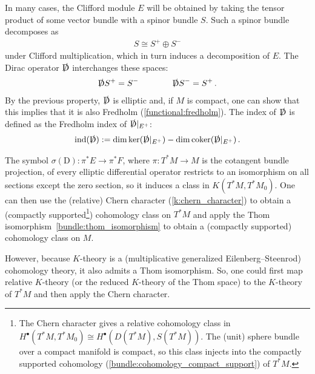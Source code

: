    \begin{definition}[Index]
        In many cases, the Clifford module $E$ will be obtained by taking the tensor product of some vector bundle with a spinor bundle $S$. Such a spinor bundle decomposes as
        \begin{gather}
            S\cong S^+\oplus S^-
        \end{gather}
        under Clifford multiplication, which in turn induces a decomposition of $E$. The Dirac operator $\slashed{\mathrm{D}}$ interchanges these spaces:
        \begin{gather}
            \slashed{\mathrm{D}}S^+=S^-\qquad\qquad\slashed{\mathrm{D}}S^-=S^+\,.
        \end{gather}
        By the previous property, $\slashed{\mathrm{D}}$ is elliptic and, if $M$ is compact, one can show that this implies that it is also Fredholm (\cref{functional:fredholm}). The index of $\slashed{\mathrm{D}}$ is defined as the Fredholm index of $\slashed{\mathrm{D}}|_{E^+}$:
        \begin{gather}
            \mathrm{ind}(\slashed{\mathrm{D}}) := \dim\ker(\slashed{\mathrm{D}}|_{E^+})-\dim\mathrm{coker}(\slashed{\mathrm{D}}|_{E^+})\,.
        \end{gather}
    \end{definition}

    The symbol $\sigma(\mathrm{D}):\pi^*E\rightarrow\pi^*F$, where $\pi:T^*M\rightarrow M$ is the cotangent bundle projection, of every elliptic differential operator restricts to an isomorphism on all sections except the zero section, so it induces a class in $K(T^*M,T^*M_0)$. One can then use the (relative) Chern character (\cref{k:chern_character}) to obtain a (compactly supported\footnote{The Chern character gives a relative cohomology class in $H^\bullet(T^*M,T^*M_0)\cong H^\bullet(D(T^*M),S(T^*M))$. The (unit) sphere bundle over a compact manifold is compact, so this class injects into the compactly supported cohomology (\cref{bundle:cohomology_compact_support}) of $T^*M$.}) cohomology class on $T^*M$ and apply the Thom isomorphism~\ref{bundle:thom_isomorphism} to obtain a (compactly supported) cohomology class on $M$.

    However, because $K$-theory is a (multiplicative generalized Eilenberg--Steenrod) cohomology theory, it also admits a Thom isomorphism. So, one could first map relative $K$-theory (or the reduced $K$-theory of the Thom space) to the $K$-theory of $T^*M$ and then apply the Chern character.

